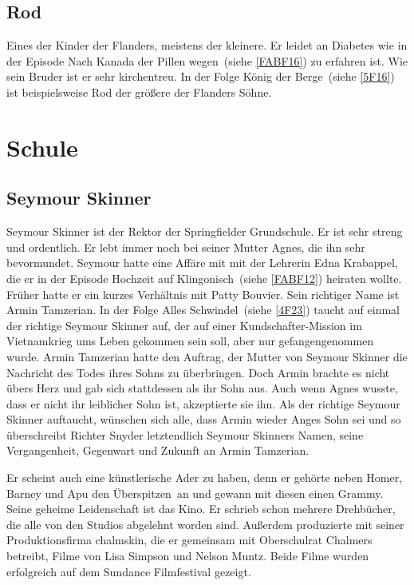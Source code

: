 \subsection{Rod}
Eines der Kinder der Flanders, meistens der kleinere. Er leidet an Diabetes wie in der Episode \glqq Nach Kanada der Pillen wegen\grqq\ (siehe \ref{FABF16}) zu erfahren ist. Wie sein Bruder ist er sehr \glqq kirchentreu\grqq . In der Folge \glqq König der Berge\grqq\ (siehe \ref{5F16}) ist beispielsweise Rod der größere der Flanders Söhne.

\section{Schule}

\subsection{Seymour Skinner}\label{SeymourSkinner}
Seymour Skinner ist der Rektor der Springfielder Grundschule. Er ist sehr streng und ordentlich. Er lebt immer noch bei seiner Mutter Agnes, die ihn sehr bevormundet. Seymour hatte eine Affäre mit mit der Lehrerin Edna Krabappel, die er in der Episode \glqq Hochzeit auf Klingonisch\grqq\ (siehe \ref{FABF12}) heiraten wollte. Früher hatte er ein kurzes Verhältnis mit Patty Bouvier. Sein richtiger Name ist Armin Tamzerian. In der Folge \glqq Alles Schwindel\grqq\ (siehe \ref{4F23}) taucht auf einmal der richtige Seymour Skinner auf, der auf einer Kundschafter-Mission im Vietnamkrieg ums Leben gekommen sein soll, aber nur gefangengenommen wurde. Armin Tamzerian hatte den Auftrag, der Mutter von Seymour Skinner die Nachricht des Todes ihres Sohns zu überbringen. Doch Armin brachte es nicht übers Herz und gab sich stattdessen als ihr Sohn aus. Auch wenn Agnes wusste, dass er nicht ihr leiblicher Sohn ist, akzeptierte sie ihn. Als der richtige Seymour Skinner auftaucht, wünschen sich alle, dass Armin wieder Anges Sohn sei und so überschreibt Richter Snyder letztendlich Seymour Skinners Namen, seine Vergangenheit, Gegenwart und Zukunft an Armin Tamzerian.

Er scheint auch eine künstlerische Ader zu haben, denn er gehörte neben Homer, Barney und Apu den \glqq Überspitzen\grqq\ an und gewann mit diesen einen Grammy. Seine geheime Leidenschaft ist das Kino. Er schrieb schon mehrere Drehbücher, die alle von den Studios abgelehnt worden sind. Außerdem produzierte mit seiner Produktionsfirma \glqq chalmskin\grqq , die er gemeinsam mit Oberschulrat Chalmers betreibt, Filme von Lisa Simpson und Nelson Muntz. Beide Filme wurden erfolgreich auf dem Sundance Filmfestival gezeigt.

